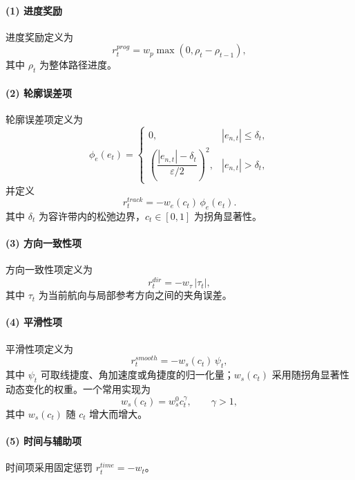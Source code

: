 \documentclass[preprint,12pt]{elsarticle}
\begin{document}
\paragraph{(1) 进度奖励} 进度奖励定义为
\begin{equation}
 r_t^{prog}=w_p\max(0,\rho_t-\rho_{t-1}),
\end{equation}
其中 $\rho_t$ 为整体路径进度。

\paragraph{(2) 轮廓误差项} 轮廓误差项定义为
\begin{equation}
\phi_e(e_t)=
\begin{cases}
0, & |e_{n,t}|\leq \delta_t,\\[4pt]
\left(\dfrac{|e_{n,t}|-\delta_t}{\varepsilon/2}\right)^2, & |e_{n,t}|>\delta_t,
\end{cases}
\end{equation}
并定义
\begin{equation}
 r_t^{track}=-w_e(c_t)\,\phi_e(e_t).
\end{equation}
其中 $\delta_t$ 为容许带内的松弛边界，$c_t\in[0,1]$ 为拐角显著性。

\paragraph{(3) 方向一致性项} 方向一致性项定义为
\begin{equation}
 r_t^{dir}=-w_{\tau}\,|\tau_t|,
\end{equation}
其中 $\tau_t$ 为当前航向与局部参考方向之间的夹角误差。

\paragraph{(4) 平滑性项} 平滑性项定义为
\begin{equation}
 r_t^{smooth}=-w_s(c_t)\,\psi_t,
\end{equation}
其中 $\psi_t$ 可取线捷度、角加速度或角捷度的归一化量；$w_s(c_t)$ 采用随拐角显著性动态变化的权重。一个常用实现为
\begin{equation}
 w_s(c_t)=w_s^0 c_t^{\gamma}, \qquad \gamma>1,
\end{equation}
其中 $w_s(c_t)$ 随 $c_t$ 增大而增大。

\paragraph{(5) 时间与辅助项} 时间项采用固定惩罚 $r_t^{time}=-w_t$。
\end{document}

